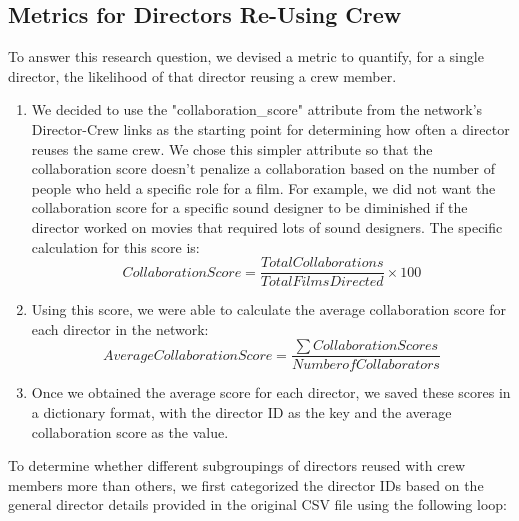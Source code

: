 \documentclass[12pt]{article}
\begin{document}
\subsection*{Metrics for Directors Re-Using Crew}
To answer this research question, we devised a metric to quantify, for a single director, the likelihood of that director reusing a crew member.
\begin{enumerate}
\item We decided to use the "collaboration\_score" attribute from the network's Director-Crew links as the starting point for determining how often a director reuses the same crew. We chose this simpler attribute so that the collaboration score doesn't penalize a collaboration based on the number of people who held a specific role for a film. For example, we did not want the collaboration score for a specific sound designer to be diminished if the director worked on movies that required lots of sound designers. The specific calculation for this score is: 
\begin{equation} \label{eq:collaboration_score}
    CollaborationScore = \frac{TotalCollaborations}{Total Films Directed}\times100 
\end{equation}

\item Using this score, we were able to calculate the average collaboration score for each director in the network:
\begin{equation} \label{eq:avgCollaboration_score}
    Average Collaboration Score = \frac{\sum{CollaborationScores}}{Number of Collaborators}
\end{equation}

\item Once we obtained the average score for each director, we saved these scores in a dictionary format, with the director ID as the key and the average collaboration score as the value.
\end{enumerate}

\par
To determine whether different subgroupings of directors reused with crew members more than others, we first categorized the director IDs based on the general director details provided in the original CSV file using the following loop:
\end{document}
